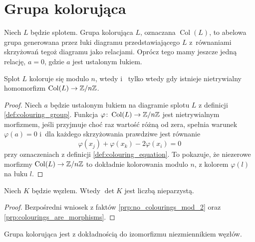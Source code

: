 \section{Grupa kolorująca}

\begin{definition}
\label{def:colouring_group}%
    Niech $L$ będzie splotem.
    Grupa kolorująca $L$, oznaczana $\operatorname{Col}(L)$, to abelowa grupa generowana przez łuki diagramu przedstawiającego $L$ z~równaniami skrzyżowań tegoż diagramu jako relacjami.
    Oprócz tego mamy jeszcze jedną relację, $a = 0$, gdzie $a$ jest ustalonym łukiem.
\end{definition}

\begin{proposition}
\label{prp:colourings_are_morphisms}%
    Splot $L$ koloruje się modulo $n$, wtedy i  ~tylko wtedy gdy istnieje nietrywialny homomorfizm $\operatorname{Col}(L) \to \mathbb Z/n\mathbb Z$.
\end{proposition}

\begin{proof}
    Niech $a$ będzie ustalonym łukiem na diagramie splotu $L$ z definicji \ref{def:colouring_group}.
    Funkcja $\varphi \colon \operatorname{Col}(L) \to \mathbb Z/n\mathbb Z$ jest nietrywialnym morfizmem, jeśli przyjmuje choć raz wartość różną od zera, spełnia warunek $\varphi(a) = 0$ i~dla każdego skrzyżowania prawdziwe jest równanie
    \begin{equation}
        \varphi(x_j) + \varphi(x_k) - 2\varphi(x_i) = 0
    \end{equation}
    przy oznaczeniach z definicji \ref{def:colouring_equation}.
    To pokazuje, że niezerowe morfizmy $\operatorname{Col}(L) \to \mathbb Z/n\mathbb Z$ to dokładnie kolorowania modulo $n$, z kolorem $\varphi(l)$ na łuku $l$.
\end{proof}

\begin{corollary}
%
\label{cor:knot_determinant_odd}%
    Niech $K$ będzie węzłem.
    Wtedy $\det K$ jest liczbą nieparzystą.
\end{corollary}

\begin{proof}
    Bezpośredni wniosek z faktów \ref{prp:no_colourings_mod_2} oraz \ref{prp:colourings_are_morphisms}.
\end{proof}

\begin{proposition}
    Grupa kolorująca jest z dokładnością do izomorfizmu niezmiennikiem węzłów.
\end{proposition}

